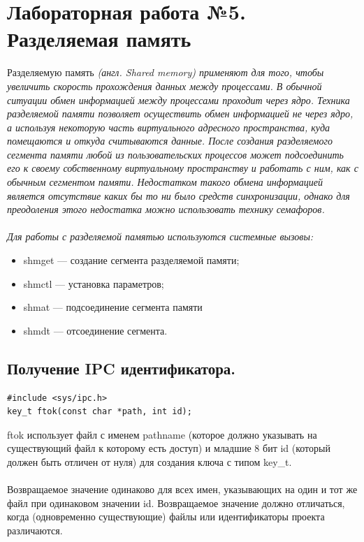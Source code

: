 \documentclass[a4paper]{article}
\begin{document}
\section{\bf Лабораторная работа №5. Разделяемая память}
Разделяемую память \sl (англ. Shared memory) \rm применяют для того, чтобы увеличить скорость прохождения данных между процессами. В обычной ситуации обмен информацией между процессами проходит через ядро. Техника разделяемой памяти позволяет осуществить обмен информацией не через ядро, а используя некоторую часть виртуального адресного пространства, куда помещаются и откуда считываются данные. После создания разделяемого сегмента памяти любой из пользовательских процессов может подсоединить его к своему собственному виртуальному пространству и работать с ним, как с обычным сегментом памяти. Недостатком такого обмена информацией является отсутствие каких бы то ни было средств синхронизации, однако для преодоления этого недостатка можно использовать технику семафоров.\\\\
Для работы с разделяемой памятью используются системные вызовы:
\begin{itemize}
  \item shmget — создание сегмента разделяемой памяти;
  \item shmctl — установка параметров;
  \item shmat — подсоединение сегмента памяти
  \item shmdt — отсоединение сегмента.
\end{itemize}

\subsection{\Large Получение IPC идентификатора.}
\begin{verbatim}
#include <sys/ipc.h>
key_t ftok(const char *path, int id);
\end{verbatim}
ftok использует файл с именем pathname (которое должно указывать на существующий файл к которому есть доступ) и младшие 8 бит id (который должен быть отличен от нуля) для создания ключа с типом key\_t.\\\\
Возвращаемое значение одинаково для всех имен, указывающих на один и тот же файл при одинаковом значении id. Возвращаемое значение должно отличаться, когда (одновременно существующие) файлы или идентификаторы проекта различаются.
\end{document}
